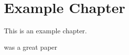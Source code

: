 \chapter{Example Chapter}
\label{chap:exChapter}

This is an example chapter.

\citet{doe2019} was a great paper \citep[e.g.][]{doe2019}